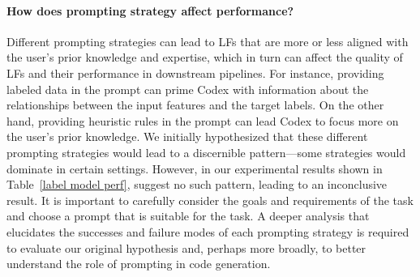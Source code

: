 \paragraph{How does prompting strategy affect performance?} 
Different prompting strategies can lead to LFs that are more or less aligned with the user's prior knowledge and expertise, which in turn can affect the quality of LFs and their performance in downstream pipelines. 
For instance, providing labeled data in the prompt can prime Codex with information about the relationships between the input features and the target labels. 
On the other hand, providing heuristic rules in the prompt can lead Codex to focus more on the user's prior knowledge. 
We initially hypothesized that these different prompting strategies would lead to a discernible pattern---some strategies would dominate in certain settings. 
However, in our experimental results shown in Table~\ref{label model perf}, suggest no such pattern, leading to an inconclusive result. 
It is important to carefully consider the goals and requirements of the task and choose a prompt that is suitable for the task. 
A deeper analysis that elucidates the successes and failure modes of each prompting strategy is required to evaluate our original hypothesis and, perhaps more broadly, to better understand the role of prompting in code generation. 


